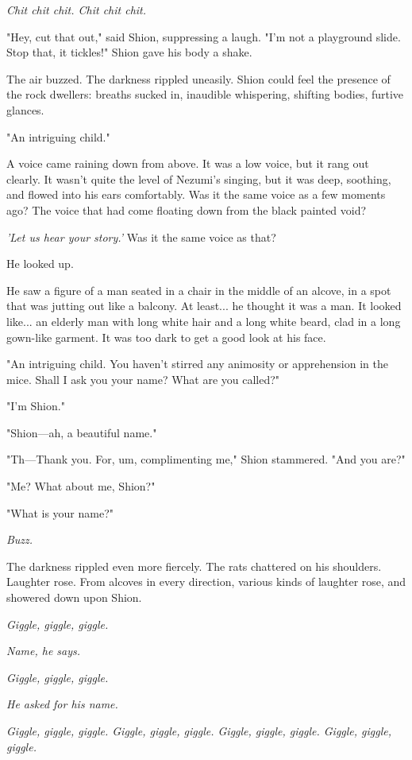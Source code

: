 \emph{Chit chit chit. Chit chit chit.}

"Hey, cut that out," said Shion, suppressing a laugh. "I'm not a
playground slide. Stop that, it tickles!" Shion gave his body a shake.

The air buzzed. The darkness rippled uneasily. Shion could feel the
presence of the rock dwellers: breaths sucked in, inaudible whispering,
shifting bodies, furtive glances.

"An intriguing child."

A voice came raining down from above. It was a low voice, but it rang
out clearly. It wasn't quite the level of Nezumi's singing, but it was
deep, soothing, and flowed into his ears comfortably. Was it the same
voice as a few moments ago? The voice that had come floating down from
the black painted void?

\emph{'Let us hear your story.'} Was it the same voice as that?

He looked up.

He saw a figure of a man seated in a chair in the middle of an alcove,
in a spot that was jutting out like a balcony. At least... he thought it
was a man. It looked like... an elderly man with long white hair and a
long white beard, clad in a long gown-like garment. It was too dark to
get a good look at his face.

"An intriguing child. You haven't stirred any animosity or apprehension
in the mice. Shall I ask you your name? What are you called?"

"I'm Shion."

"Shion---ah, a beautiful name."

"Th---Thank you. For, um, complimenting me," Shion stammered. "And you
are?"

"Me? What about me, Shion?"

"What is your name?"

\emph{Buzz.}

The darkness rippled even more fiercely. The rats chattered on his
shoulders. Laughter rose. From alcoves in every direction, various kinds
of laughter rose, and showered down upon Shion.

\emph{Giggle, giggle, giggle.}

\emph{Name, he says.}

\emph{Giggle, giggle, giggle.}

\emph{He asked for his name.}

\emph{Giggle, giggle, giggle. Giggle, giggle, giggle. Giggle, giggle, giggle.
Giggle, giggle, giggle.}

